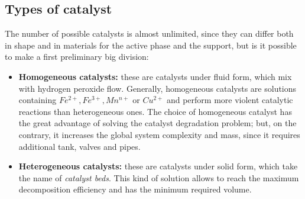 \documentclass[a4paper]{report}
\begin{document}
\subsection{Types of catalyst}

The number of possible catalysts is almost unlimited, since they can differ both in shape and in materials for the active phase and the support, but is it possible to make a first preliminary big division: 
\begin{itemize}
\item{\textbf{Homogeneous catalysts:}} these are catalysts under fluid form, which mix with hydrogen peroxide flow. %
Generally, homogeneous catalysts are solutions containing $Fe^{2+}, Fe^{3+},Mn^{n+}$ or $Cu^{2+}$ %
and perform more violent catalytic reactions than heterogeneous ones. The choice of homogeneous catalyst has the great advantage of solving the catalyst degradation problem; but, on the contrary, it increases the global system complexity and mass, since it requires additional tank, valves and pipes.
\item{\textbf{Heterogeneous catalysts:}} these are catalysts under solid form, which take the name of \textit{catalyst beds}. This kind of solution allows to reach the maximum decomposition efficiency and has the minimum required volume. %
\end{itemize}
\end{document}
